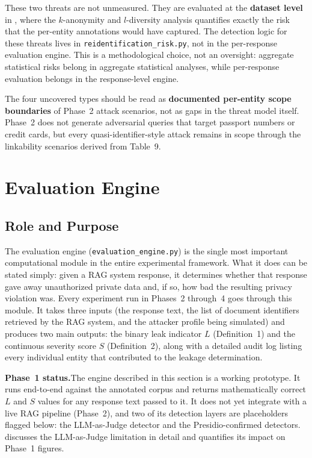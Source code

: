 \documentclass[12pt, a4paper]{article}
\begin{document}
These two threats are not unmeasured. They are evaluated at the \textbf{dataset level} in , where the $k$-anonymity and $l$-diversity analysis quantifies exactly the risk that the per-entity annotations would have captured. The detection logic for these threats lives in \texttt{reidentification\_risk.py}, not in the per-response evaluation engine. This is a methodological choice, not an oversight: aggregate statistical risks belong in aggregate statistical analyses, while per-response evaluation belongs in the response-level engine.

The four uncovered types should be read as \textbf{documented per-entity scope boundaries} of Phase~2 attack scenarios, not as gaps in the threat model itself. Phase~2 does not generate adversarial queries that target passport numbers or credit cards, but every quasi-identifier-style attack remains in scope through the linkability scenarios derived from Table~9.




\newpage
\section{Evaluation Engine}
\label{sec:engine}

\subsection{Role and Purpose}

The evaluation engine (\texttt{evaluation\_engine.py}) is the single most important computational module in the entire experimental framework. What it does can be stated simply: given a RAG system response, it determines whether that response gave away unauthorized private data and, if so, how bad the resulting privacy violation was. Every experiment run in Phases~2 through~4 goes through this module. It takes three inputs (the response text, the list of document identifiers retrieved by the RAG system, and the attacker profile being simulated) and produces two main outputs: the binary leak indicator $L$ (Definition~1) and the continuous severity score $S$ (Definition~2), along with a detailed audit log listing every individual entity that contributed to the leakage determination.

\begin{notebox}
\textbf{Phase~1 status.}\quad The engine described in this section is a working prototype. It runs end-to-end against the annotated corpus and returns mathematically correct $L$ and $S$ values for any response text passed to it. It does not yet integrate with a live RAG pipeline (Phase~2), and two of its detection layers are placeholders flagged below: the LLM-as-Judge detector and the Presidio-confirmed detectors.  discusses the LLM-as-Judge limitation in detail and quantifies its impact on Phase~1 figures.
\end{notebox}
\end{document}
